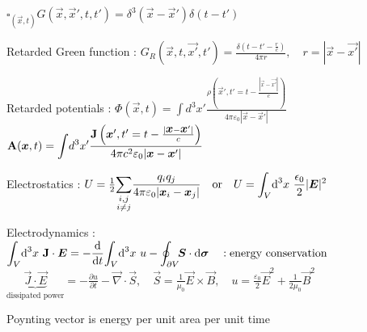 \begin{squishlist}

\item $\square_{\left(\vec{x},t\right)} G(\vec{x},\vec{x}',t,t') = \delta^3(\vec{x}-\vec{x}')\delta(t-t')$

\item Retarded Green function : $G_R(\vec{x},t,\vec{x'},t')=\frac{\delta(t-t'-\frac{r}{c})}{4\pi r}, \quad{r=|\vec{x}-\vec{x'}|} $

\item Retarded potentials : $\Phi (\vec{x},t) = \displaystyle{\int} d^3x' \frac{\rho\left(\vec{x}',t'=t-\frac{|\vec{x}-\vec{x'}|}{c}\right)}{4\pi \varepsilon_0 |\vec{x}-\vec{x}'|}$
\\
$\vec{\rm{A}}(\vec{x},t) = \displaystyle{\int} d^3 x' \frac{\vec{\rm{J}}\left(\vec{x}',t'=t-\frac{|\vec{x}-\vec{x}'|}{c}\right)}{4\pi c^2 \varepsilon_0 |\vec{x}-\vec{x}'|}$
\end{squishlist}
\begin{squishlist}
\item Electrostatics : $U = \frac{1}{2} \displaystyle{ \sum_{\substack{i,j\\i\neq j}}} \frac{q_iq_j}{4\pi\varepsilon_0|\vec{x}_i-\vec{x}_j|} \quad  \text{or} \quad U = \displaystyle{\int_{V}} \ud ^3x \,\, \frac{\epsilon_0}{2} |\vec{E}|^2$

\item Electrodynamics : $\displaystyle{\int_{V}} \ud ^3x \,\, \vec{\rm{J}}\cdot\vec{E} = - \frac{\ud }{\ud t} \displaystyle{\int_{V}} \ud ^3x \,\, u - \displaystyle{\oint_{\partial V}} \! \vec{S}\cdot\vec{\ud \sigma} \quad : \text{energy conservation}$
\\
$\underbrace{\vec{J}\cdot\vec{E}}_{\text{dissipated power}} = -\frac{\partial u}{\partial t} - \vec{\nabla}\cdot\vec{S}, \quad \vec{S} = \frac{1}{\mu_0} \vec{E}\times\vec{B} , \quad u=\frac{\varepsilon_0}{2} \vec{E}^2 + \frac{1}{2\mu_0} \vec{B}^2$

\item Poynting vector is energy per unit area per unit time
\end{squishlist}

